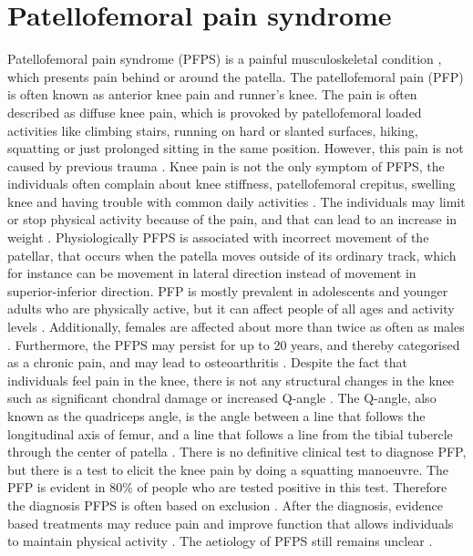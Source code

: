 \section{Patellofemoral pain syndrome}
Patellofemoral pain syndrome (PFPS) is a painful musculoskeletal condition \citep{Maclachlan2017, Smith2015}, which presents pain behind or around the patella. The patellofemoral pain (PFP) is often known as anterior knee pain and runner’s knee. The pain is often described as diffuse knee pain, which is provoked by patellofemoral loaded activities like climbing stairs, running on hard or slanted surfaces, hiking, squatting or just prolonged sitting in the same position.\citep{Smith2015, Crossley2016, Boudreau2017, Crossley2015} However, this pain is not caused by previous trauma \citep{Crossley2016}.
Knee pain is not the only symptom of PFPS, the individuals often complain about knee stiffness, patellofemoral crepitus, swelling knee and having trouble with common daily activities \citep{Crossley2016, Martini2012}. The individuals may limit or stop physical activity because of the pain, and that can lead to an increase in weight \citep{Petersen2013, Crossley2016}.\newline
\noindent
Physiologically PFPS is associated with incorrect movement of the patellar, that occurs when the patella moves outside of its ordinary track, which for instance can be movement in lateral direction instead of movement in superior-inferior direction.\citep{Martini2012} \newline
\noindent
PFP is mostly prevalent in adolescents and younger adults who are physically active, but it can affect people of all ages and activity levels \citep{Maclachlan2017, Crossley2016, Crossley2015}. Additionally,  females are affected about more than twice as often as males \citep{Petersen2013}. Furthermore, the PFPS may persist for up to 20 years, and thereby categorised as a chronic pain, and may lead to osteoarthritis \citep{Petersen2013, Crossley2016}.\newline
\noindent
Despite the fact that individuals feel pain in the knee, there is not any structural changes in the knee such as significant chondral damage or increased Q-angle \citep{Petersen2013}. The Q-angle, also known as the quadriceps angle, is the angle between a line that follows the longitudinal axis of femur, and a line that follows a line from the tibial tubercle through the center of patella \citep{Dahab2011}. \newline
\noindent
There is no definitive clinical test to diagnose PFP, but there is a test to elicit the knee pain by doing a squatting manoeuvre. The PFP is evident in 80\% of people who are tested positive in this test.\citep{Crossley2016, Crossley2015} Therefore the diagnosis PFPS is often based on exclusion \citep{Petersen2013}. After the diagnosis, evidence based treatments may reduce pain and improve function that allows individuals to maintain physical activity \citep{Crossley2015}.
The aetiology of PFPS still remains unclear \citep{Smith2015}.

